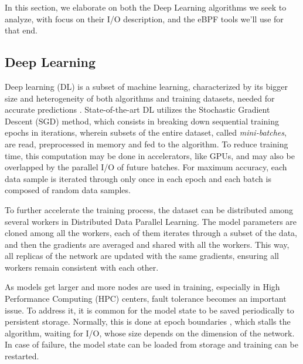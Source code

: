 \documentclass[conference]{IEEEtran}
\begin{document}

In this section, we elaborate on both the Deep Learning algorithms we seek to analyze, with focus on their I/O description, and the eBPF tools we'll use for that end.

\subsection{Deep Learning}

Deep learning (DL) is a subset of machine learning, characterized by its bigger size and heterogeneity of both algorithms and training datasets, needed for accurate predictions \cite{gradient}. State-of-the-art DL utilizes the Stochastic Gradient Descent (SGD) method, which consists in breaking down sequential training epochs in iterations, wherein subsets of the entire dataset, called \textit{mini-batches}, are read, preprocessed in memory and fed to the algorithm. To reduce training time, this computation may be done in accelerators, like GPUs, and may also be overlapped by the parallel I/O of future batches. For maximum accuracy, each data sample is iterated through only once in each epoch and each batch is composed of random data samples.

To further accelerate the training process, the dataset can be distributed among several workers in Distributed Data Parallel Learning. The model parameters are cloned among all the workers, each of them iterates through a subset of the data, and then the gradients are averaged and shared with all the workers. This way, all replicas of the network are updated with the same gradients, ensuring all workers remain consistent with each other.

As models get larger and more nodes are used in training, especially in High Performance Computing (HPC) centers, fault tolerance becomes an important issue. To address it, it is common for the model state to be saved periodically to persistent storage. Normally, this is done at epoch boundaries \cite{checkfreq}, which stalls the algorithm, waiting for I/O, whose size depends on the dimension of the network. In case of failure, the model state can be loaded from storage and training can be restarted.
\end{document}
